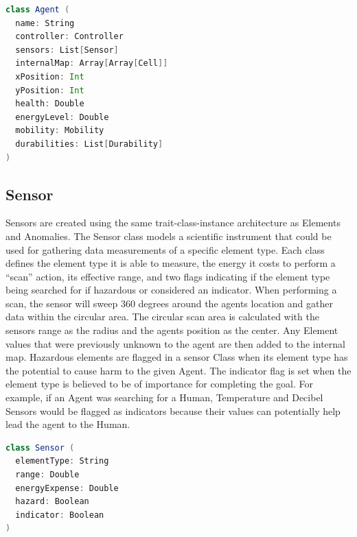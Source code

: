 \begin{lstlisting}[language=Scala, label=code:agent]
class Agent (
  name: String
  controller: Controller
  sensors: List[Sensor]
  internalMap: Array[Array[Cell]]
  xPosition: Int
  yPosition: Int
  health: Double
  energyLevel: Double
  mobility: Mobility
  durabilities: List[Durability]
)
\end{lstlisting}


\subsection{Sensor} \label{subsec:sensor}
Sensors are created using the same trait-class-instance architecture as Elements and Anomalies.
The Sensor class models a scientific instrument that could be used for gathering data measurements of a specific element type.
Each class defines the element type it is able to measure, the energy it costs to perform a ``scan'' action, its effective range, and two flags indicating if the element type being searched for if hazardous or considered an indicator.
When performing a scan, the sensor will sweep 360 degrees around the agents location and gather data within the circular area.
The circular scan area is calculated with the sensors range as the radius and the agents position as the center.
Any Element values that were previously unknown to the agent are then added to the internal map.
Hazardous elements are flagged in a sensor Class when its element type has the potential to cause harm to the given Agent.
The indicator flag is set when the element type is believed to be of importance for completing the goal.
For example, if an Agent was searching for a Human, Temperature and Decibel Sensors would be flagged as indicators because their values can potentially help lead the agent to the Human.

\begin{lstlisting}[language=Scala]
class Sensor (
  elementType: String
  range: Double
  energyExpense: Double
  hazard: Boolean
  indicator: Boolean
)
\end{lstlisting}


